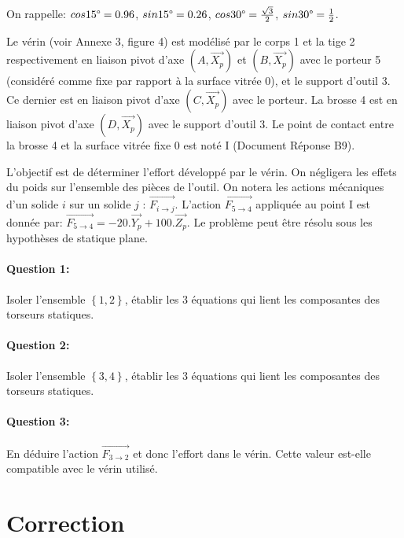 On rappelle: $cos15\degree=0.96$, $sin15\degree=0.26$, $cos30\degree=\frac{\sqrt{3}}{2}$, $sin30\degree=\frac{1}{2}$.
 
Le vérin (voir Annexe 3, figure 4) est modélisé par le corps 1 et la tige 2 respectivement en liaison pivot d'axe $(A,\overrightarrow{X_p})$ et $(B,\overrightarrow{X_p})$ avec le porteur 5 (considéré comme fixe par rapport à la surface vitrée 0), et le support d'outil 3. Ce dernier est en liaison pivot d'axe $(C,\overrightarrow{X_p})$ avec le porteur. La brosse 4 est en liaison pivot d'axe $(D,\overrightarrow{X_p})$ avec le support d'outil 3. Le point de contact entre la brosse 4 et la surface vitrée fixe 0 est noté I (Document Réponse B9). 

L'objectif est de déterminer l'effort développé par le vérin. On négligera les effets du poids sur l'ensemble des pièces de l'outil. On notera les actions mécaniques d'un solide $i$ sur un solide $j$ : $\overrightarrow{F_{i\rightarrow j}}$. L'action  $\overrightarrow{F_{5\rightarrow 4}}$ appliquée au point I est donnée par: $\overrightarrow{F_{5\rightarrow 4}}=-20.\overrightarrow{Y_p}+100.\overrightarrow{Z_p}$. Le problème peut être résolu sous les hypothèses de statique plane. 
 
\paragraph{Question 1:} Isoler l'ensemble $\left\{1,2\right\}$, établir les 3 équations qui lient les composantes des torseurs statiques.

\paragraph{Question 2:} Isoler l'ensemble $\left\{3,4\right\}$, établir les 3 équations qui lient les composantes des torseurs statiques.
 
\paragraph{Question 3:} En déduire l'action $\overrightarrow{F_{3\rightarrow 2}}$ et donc l'effort dans le vérin. Cette valeur est-elle compatible avec le vérin utilisé.

\ifdef{\public}{}{}

\clearpage

\newpage

\section{Correction}

